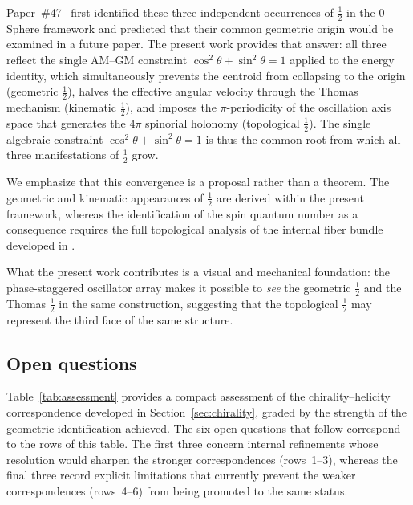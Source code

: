 \documentclass[%
 reprint, amsmath,amssymb, aps, prb, ]{revtex4-2}
\numberwithin{equation}{section}
\newcommand{\iphase}{\theta}
\begin{document}
Paper~\#47~\cite{hanamura47} first identified these three independent occurrences of $\tfrac{1}{2}$ in the 0-Sphere framework and predicted that their common geometric origin would be examined in a future paper. The present work provides that answer: all three reflect the single AM--GM constraint $\cos^2\iphase + \sin^2\iphase = 1$ applied to the energy identity, which simultaneously prevents the centroid from collapsing to the origin (geometric $\tfrac{1}{2}$), halves the effective angular velocity through the Thomas mechanism (kinematic $\tfrac{1}{2}$), and imposes the $\pi$-periodicity of the oscillation axis space that generates the $4\pi$ spinorial holonomy (topological $\tfrac{1}{2}$). The single algebraic constraint $\cos^2\iphase + \sin^2\iphase = 1$ is thus the common root from which all three manifestations of $\tfrac{1}{2}$ grow.

We emphasize that this convergence is a proposal rather than a theorem. The geometric and kinematic appearances of $\tfrac{1}{2}$ are derived within the present framework, whereas the identification of the spin quantum number as a consequence requires the full topological analysis of the internal fiber bundle developed in \cite{hanamura26}.

What the present work contributes is a visual and mechanical foundation: the phase-staggered oscillator array makes it possible to \emph{see} the geometric $\tfrac{1}{2}$ and the Thomas $\tfrac{1}{2}$ in the same construction, suggesting that the topological $\tfrac{1}{2}$ may represent the third face of the same structure.

\subsection{Open questions}

Table~\ref{tab:assessment} provides a compact assessment of the chirality--helicity correspondence developed in Section~\ref{sec:chirality}, graded by the strength of the geometric identification achieved. The six open questions that follow correspond to the rows of this table. The first three concern internal refinements whose resolution would sharpen the stronger correspondences (rows~1--3), whereas the final three record explicit limitations that currently prevent the weaker correspondences (rows~4--6) from being promoted to the same status.
\end{document}
